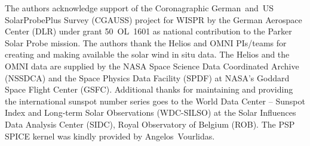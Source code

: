 \begin{acknowledgements}
	The authors acknowledge support of the Coronagraphic German~and~US SolarProbePlus Survey (CGAUSS) project for WISPR by the German Aerospace Center (DLR) under grant 50~OL~1601 as national contribution to the Parker Solar Probe mission. The authors thank the Helios and OMNI PIs/teams for creating and making available the solar wind in situ data. The Helios and the OMNI data are supplied by the NASA Space Science Data Coordinated Archive (NSSDCA) and the Space Physics Data Facility (SPDF) at NASA's Goddard Space Flight Center (GSFC). Additional thanks for maintaining and providing the international sunspot number series goes to the World Data Center -- Sunspot Index and Long-term Solar Observations (WDC-SILSO) at the Solar Influences Data Analysis Center (SIDC), Royal Observatory of Belgium (ROB). The PSP SPICE kernel was kindly provided by Angelos~Vourlidas.
\end{acknowledgements}
